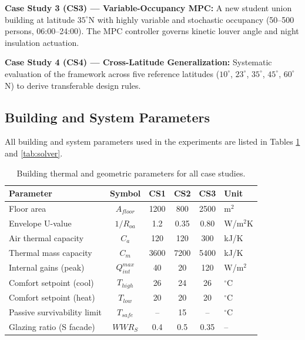 \documentclass[preprint,12pt]{elsarticle}
\begin{document}
\textbf{Case Study 3 (CS3) --- Variable-Occupancy MPC:} A new student union building at latitude $35^\circ$N with highly variable and stochastic occupancy (50--500 persons, 06:00--24:00). The MPC controller governs kinetic louver angle and night insulation actuation.

\textbf{Case Study 4 (CS4) --- Cross-Latitude Generalization:} Systematic evaluation of the framework across five reference latitudes ($10^\circ$, $23^\circ$, $35^\circ$, $45^\circ$, $60^\circ$N) to derive transferable design rules.

\subsection{Building and System Parameters}

All building and system parameters used in the experiments are listed in Tables \ref{tab:building} and \ref{tab:solver}.

\begin{table}[htbp]
\centering
\caption{Building thermal and geometric parameters for all case studies.}
\label{tab:building}
\begin{tabularx}{\textwidth}{@{} l c c c c >{\raggedright\arraybackslash}X @{}}
\toprule
\textbf{Parameter} & \textbf{Symbol} & \textbf{CS1} & \textbf{CS2} & \textbf{CS3} & \textbf{Unit} \\
\midrule
Floor area & $A_{floor}$ & 1200 & 800 & 2500 & m$^2$ \\
Envelope U-value & $1/R_{oa}$ & 1.2 & 0.35 & 0.80 & W/m$^2$K \\
Air thermal capacity & $C_a$ & 120 & 120 & 300 & kJ/K \\
Thermal mass capacity & $C_m$ & 3600 & 7200 & 5400 & kJ/K \\
Internal gains (peak) & $Q_{int}^{max}$ & 40 & 20 & 120 & W/m$^2$ \\
Comfort setpoint (cool) & $T_{high}$ & 26 & 24 & 26 & $^\circ$C \\
Comfort setpoint (heat) & $T_{low}$ & 20 & 20 & 20 & $^\circ$C \\
Passive survivability limit & $T_{safe}$ & -- & 15 & -- & $^\circ$C \\
Glazing ratio (S facade) & $WWR_S$ & 0.4 & 0.5 & 0.35 & -- \\
\bottomrule
\end{tabularx}
\end{table}
\end{document}
